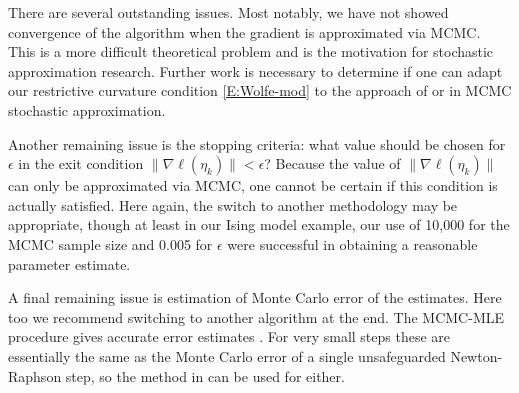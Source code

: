 There are several outstanding issues.  Most notably, we have not showed convergence of 
the algorithm when the gradient 
is approximated via MCMC.  This is a more difficult theoretical problem and is the 
motivation for stochastic 
approximation research.  
Further work is necessary to determine if one can adapt our restrictive curvature 
condition \eqref{E:Wolfe-mod} to the 
approach of \citet{Andrieu:2005} or \citet{Liang:2010} in MCMC stochastic 
approximation.  

Another remaining issue is the stopping criteria: what value should be chosen for $
\epsilon$ in the exit condition
$\lVert  \nabla \ell( \eta_k ) \rVert < \epsilon$?  Because the value of $\lVert  
\nabla \ell( \eta_k ) \rVert$ can only 
be approximated via MCMC, one cannot be certain if this condition is actually 
satisfied.  Here again, the switch to 
another methodology may be appropriate, though at least in our Ising model example, 
our use of 10,000 for the MCMC 
sample size and 0.005 for $\epsilon$ were successful in obtaining a reasonable 
parameter estimate. 

 A final remaining issue is estimation of Monte Carlo error of the estimates.  Here 
too we recommend switching to another
algorithm at the end.  The MCMC-MLE procedure gives accurate error estimates \citep
{Geyer:1994}.
For very small steps these are essentially the same as the Monte Carlo error of a 
single unsafeguarded Newton-Raphson step,
so the method in \citep{Geyer:1994} can be used for either.
